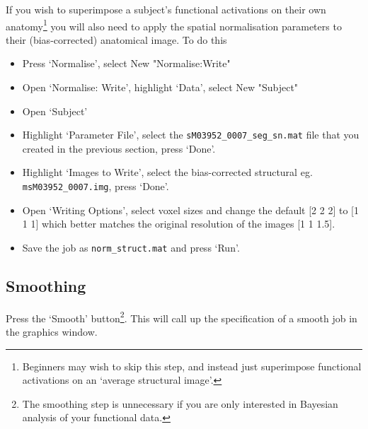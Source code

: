 \documentclass[a4paper,titlepage]{book}
\newcommand{\bi}{\begin{itemize}}
\newcommand{\ei}{\end{itemize}}
\begin{document}
If you wish to superimpose a subject's functional activations on their own anatomy\footnote{Beginners may wish to skip this step, and instead just superimpose functional activations on an `average structural image'.} you will also need to 
apply the spatial normalisation parameters to their 
(bias-corrected) anatomical image. To do this
\bi
\item{Press `Normalise', select New "Normalise:Write"}
\item{Open `Normalise: Write', highlight `Data', select 
New "Subject"}
\item{Open `Subject'}
\item{Highlight `Parameter File', select the  \verb!sM03952_0007_seg_sn.mat! file that you 
created in the previous section, press `Done'.}
\item{Highlight `Images to Write', select the 
bias-corrected structural eg. \verb!msM03952_0007.img!, press `Done'.}
\item{Open `Writing Options', select voxel sizes and 
change the default [2 2 2] to [1 1 1] which better matches the original resolution of the images [1 1 1.5].}
\item{Save the job as \verb!norm_struct.mat! and press `Run'}.
\ei

\subsection{Smoothing}

Press the `Smooth' button\footnote{The smoothing step is unnecessary if you are only interested in Bayesian analysis of your functional data.}. This will call up the specification of a smooth job in the graphics 
window.
\end{document}
